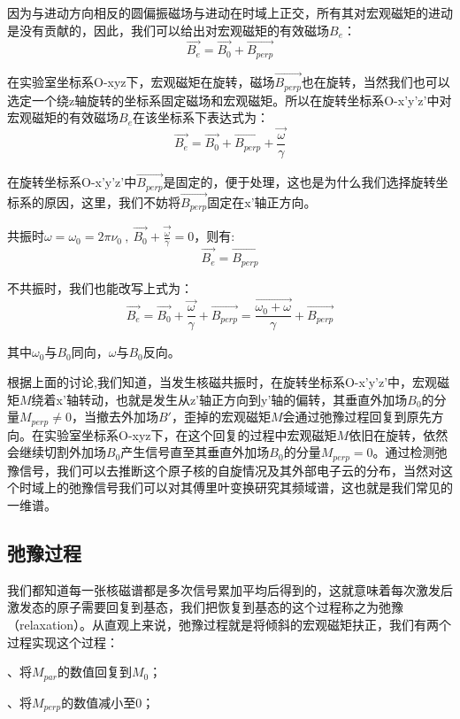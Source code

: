 因为与进动方向相反的圆偏振磁场与进动在时域上正交，所有其对宏观磁矩的进动是没有贡献的，因此，我们可以给出对宏观磁矩的有效磁场$B_e$：
\[\overrightarrow{B_e}=\overrightarrow{B_0}+\overrightarrow{B_{perp}}\]

在实验室坐标系O-xyz下，宏观磁矩在旋转，磁场$\overrightarrow{B_{perp}}$也在旋转，当然我们也可以选定一个绕z轴旋转的坐标系固定磁场和宏观磁矩。所以在旋转坐标系O-x'y'z'中对宏观磁矩的有效磁场$B_e$在该坐标系下表达式为：
\[\overrightarrow{B_e}=\overrightarrow{B_0}+\overrightarrow{B_{perp}}+\overrightarrow{\frac{\omega}{\gamma}} \tag{d}\]

在旋转坐标系O-x'y'z'中$\overrightarrow{B_{perp}}$是固定的，便于处理，这也是为什么我们选择旋转坐标系的原因，这里，我们不妨将$\overrightarrow{B_{perp}}$固定在x'轴正方向。

共振时$\omega=\omega_0=2\pi \nu_0 \ , \ \overrightarrow{B_0}+\overrightarrow{\frac{\omega}{\gamma}}=0$，则有:
\[\overrightarrow{B_e}=\overrightarrow{B_{perp}} \tag{e}\]

不共振时，我们也能改写上式为：
\[\overrightarrow{B_e}=\overrightarrow{B_0}+\overrightarrow{\frac{\omega}{\gamma}}+\overrightarrow{B_{perp}}=\overrightarrow{\frac{\omega_0+\omega}{\gamma}}+\overrightarrow{B_{perp}}\]

其中$\omega_0$与$B_0$同向，$\omega$与$B_0$反向。

根据上面的讨论,我们知道，当发生核磁共振时，在旋转坐标系O-x'y'z'中，宏观磁矩$M$绕着x'轴转动，也就是发生从z'轴正方向到y'轴的偏转，其垂直外加场$B_0$的分量$M_{perp} \neq 0$，当撤去外加场$B'$，歪掉的宏观磁矩$M$会通过弛豫过程回复到原先方向。在实验室坐标系O-xyz下，在这个回复的过程中宏观磁矩$M$依旧在旋转，依然会继续切割外加场$B_0$产生信号直至其垂直外加场$B_0$的分量$M_{perp}=0$。通过检测弛豫信号，我们可以去推断这个原子核的自旋情况及其外部电子云的分布，当然对这个时域上的弛豫信号我们可以对其傅里叶变换研究其频域谱，这也就是我们常见的一维谱。

\subsection{弛豫过程}

我们都知道每一张核磁谱都是多次信号累加平均后得到的，这就意味着每次激发后激发态的原子需要回复到基态，我们把恢复到基态的这个过程称之为弛豫（relaxation）。从直观上来说，弛豫过程就是将倾斜的宏观磁矩扶正，我们有两个过程实现这个过程：

、将$M_{par}$的数值回复到$M_0$；

、将$M_{perp}$的数值减小至0；

